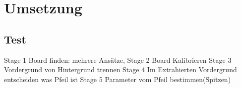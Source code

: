 
\chapter{Umsetzung}
\label{chap:coding}


\section{Test}
Stage 1 Board finden:
     mehrere Ansätze,
Stage 2 Board Kalibrieren
Stage 3 Vordergrund von Hintergrund trennen
Stage 4 Im Extrahierten Vordergrund entscheiden was Pfeil ist
Stage 5 Parameter vom Pfeil bestimmen(Spitzen)
